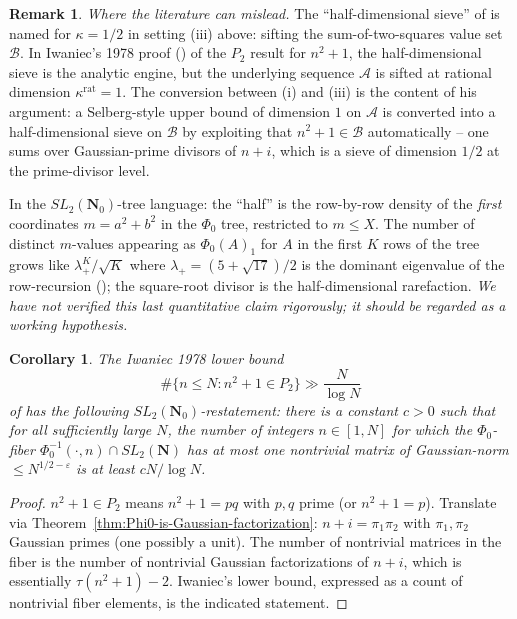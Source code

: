 \documentclass[11pt]{article}
\newtheorem{corollary}[theorem]{Corollary}
\theoremstyle{definition}
\newtheorem{remark}[theorem]{Remark}
\newcommand{\N}{\mathbf{N}}
\newcommand{\Nz}{\mathbf{N}_0}
\newcommand{\SLNz}{SL_2(\Nz)}
\newcommand{\SLN}{SL_2(\N)}
\begin{document}
\begin{remark}\label{rmk:half-dim-tree-meaning}
\emph{Where the literature can mislead.} The ``half-dimensional sieve'' of
\cite{iwaniec1976} is named for $\kappa = 1/2$ in setting (iii) above: sifting the
sum-of-two-squares value set $\mathcal{B}$. In Iwaniec's 1978 proof
(\cite{iwaniec1978}) of the $P_2$ result for $n^2+1$, the half-dimensional sieve is the
analytic engine, but the underlying sequence $\mathcal{A}$ is sifted at rational
dimension $\kappa^{\mathrm{rat}} = 1$. The conversion between (i) and (iii) is the
content of his argument: a Selberg-style upper bound of dimension $1$ on $\mathcal{A}$
is converted into a half-dimensional sieve on $\mathcal{B}$ by exploiting that
$n^2+1 \in \mathcal{B}$ automatically -- one sums over Gaussian-prime divisors of
$n+i$, which is a sieve of dimension $1/2$ at the prime-divisor level.

In the $\SLNz$-tree language: the ``half'' is the row-by-row density of the \emph{first}
coordinates $m = a^2+b^2$ in the $\Phi_0$ tree, restricted to $m \le X$. The number of
distinct $m$-values appearing as $\Phi_0(A)_1$ for $A$ in the first $K$ rows of the tree
grows like $\lambda_+^K / \sqrt{K}$ where $\lambda_+ = (5+\sqrt{17})/2$ is the dominant
eigenvalue of the row-recursion (\cite[\S row-recursions]{R4-binary-quadratic-forms}); the
square-root divisor is the half-dimensional rarefaction. \emph{We have not verified this
last quantitative claim rigorously; it should be regarded as a working hypothesis.}
\end{remark}

\begin{corollary}\label{cor:iwaniec-restated}
The Iwaniec 1978 lower bound
\[
   \#\{n \le N : n^2+1 \in P_2\} \gg \frac{N}{\log N}
\]
of \cite{iwaniec1978} has the following $\SLNz$-restatement: there is a constant $c > 0$
such that for all sufficiently large $N$, the number of integers $n \in [1,N]$ for which
the $\Phi_0$-fiber $\Phi_0^{-1}(\cdot, n) \cap \SLN$ has at most one nontrivial matrix
of Gaussian-norm $\le N^{1/2-\varepsilon}$ is at least $cN/\log N$.
\end{corollary}

\begin{proof}
$n^2+1 \in P_2$ means $n^2+1 = pq$ with $p, q$ prime (or $n^2+1 = p$). Translate via
Theorem~\ref{thm:Phi0-is-Gaussian-factorization}: $n+i = \pi_1 \pi_2$ with $\pi_1, \pi_2$
Gaussian primes (one possibly a unit). The number of nontrivial matrices in the fiber is
the number of nontrivial Gaussian factorizations of $n+i$, which is essentially
$\tau(n^2+1) - 2$. Iwaniec's lower bound, expressed as a count of nontrivial fiber
elements, is the indicated statement.
\end{proof}
\end{document}
